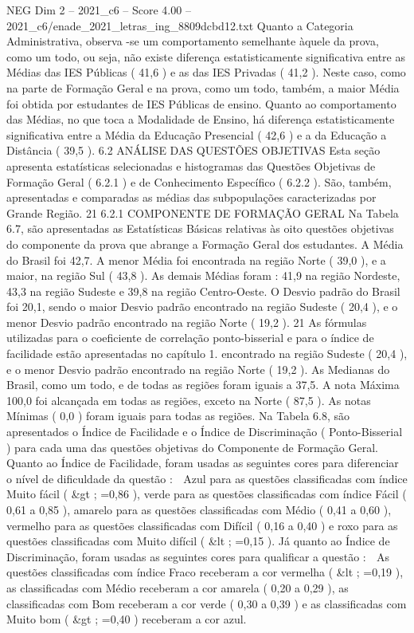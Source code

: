 \begin{textsample}{NEG Dim 2 – 2021\_c6 – Score 4.00 – 2021\_c6/enade\_2021\_letras\_ing\_8809dcbd12.txt}
Quanto a Categoria Administrativa, observa -se um comportamento semelhante àquele da prova, como um todo, ou seja, não existe diferença estatisticamente significativa entre as Médias das IES Públicas ( 41,6 ) e as das IES Privadas ( 41,2 ).
Neste caso, como na parte de Formação Geral e na prova, como um todo, também, a maior Média foi obtida por estudantes de IES Públicas de ensino.
Quanto ao comportamento das Médias, no que toca a Modalidade de Ensino, há diferença estatisticamente significativa entre a Média da Educação Presencial ( 42,6 ) e a da Educação a Distância ( 39,5 ). 6.2 ANÁLISE DAS QUESTÕES OBJETIVAS Esta seção apresenta estatísticas selecionadas e histogramas das Questões Objetivas de Formação Geral ( 6.2.1 ) e de Conhecimento Específico ( 6.2.2 ).
São, também, apresentadas e comparadas as médias das subpopulações caracterizadas por Grande Região. 21 6.2.1 COMPONENTE DE FORMAÇÃO GERAL Na Tabela 6.7, são apresentadas as Estatísticas Básicas relativas às oito questões objetivas do componente da prova que abrange a Formação Geral dos estudantes.
A Média do Brasil foi 42,7.
A menor Média foi encontrada na região Norte ( 39,0 ), e a maior, na região Sul ( 43,8 ).
As demais Médias foram : 41,9 na região Nordeste, 43,3 na região Sudeste e 39,8 na região Centro-Oeste.
O Desvio padrão do Brasil foi 20,1, sendo o maior Desvio padrão encontrado na região Sudeste ( 20,4 ), e o menor Desvio padrão encontrado na região Norte ( 19,2 ). 21 As fórmulas utilizadas para o coeficiente de correlação ponto-bisserial e para o índice de facilidade estão apresentadas no capítulo 1. encontrado na região Sudeste ( 20,4 ), e o menor Desvio padrão encontrado na região Norte ( 19,2 ).
As Medianas do Brasil, como um todo, e de todas as regiões foram iguais a 37,5.
A nota Máxima 100,0 foi alcançada em todas as regiões, exceto na Norte ( 87,5 ).
As notas Mínimas ( 0,0 ) foram iguais para todas as regiões.
Na Tabela 6.8, são apresentados o Índice de Facilidade e o Índice de Discriminação ( Ponto-Bisserial ) para cada uma das questões objetivas do Componente de Formação Geral.
Quanto ao Índice de Facilidade, foram usadas as seguintes cores para diferenciar o nível de dificuldade da questão :  Azul para as questões classificadas com índice Muito fácil ( \&gt ; =0,86 ), verde para as questões classificadas com índice Fácil ( 0,61 a 0,85 ), amarelo para as questões classificadas com Médio ( 0,41 a 0,60 ), vermelho para as questões classificadas com Difícil ( 0,16 a 0,40 ) e roxo para as questões classificadas com Muito difícil ( \&lt ; =0,15 ).
Já quanto ao Índice de Discriminação, foram usadas as seguintes cores para qualificar a questão :  As questões classificadas com índice Fraco receberam a cor vermelha ( \&lt ; =0,19 ), as classificadas com Médio receberam a cor amarela ( 0,20 a 0,29 ), as classificadas com Bom receberam a cor verde ( 0,30 a 0,39 ) e as classificadas com Muito bom ( \&gt ; =0,40 ) receberam a cor azul.

\end{textsample}
